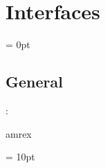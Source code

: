 
\section{Interfaces} 


\parskip = 0pt

\vspace{3mm} \subsection*{General}

: 

amrex
\vspace{2mm}

\vspace{5mm}\parskip = 10pt 
